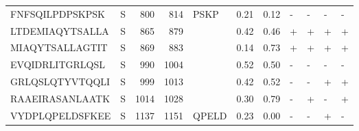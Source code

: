 \begin{tabular}{llrrlrrllll}
FNFSQILPDPSKPSK &       S &    800 &   814 &                PSKP &            0.21 &             0.12 &      - &       - &      - &       - \\
LTDEMIAQYTSALLA &       S &    865 &   879 &                     &            0.42 &             0.46 &      + &       + &      + &       + \\
MIAQYTSALLAGTIT &       S &    869 &   883 &                     &            0.14 &             0.73 &      + &       + &      + &       + \\
EVQIDRLITGRLQSL &       S &    990 &  1004 &                     &            0.52 &             0.50 &      - &       - &      - &       - \\
GRLQSLQTYVTQQLI &       S &    999 &  1013 &                     &            0.42 &             0.52 &      - &       - &      + &       + \\
RAAEIRASANLAATK &       S &   1014 &  1028 &                     &            0.30 &             0.79 &      - &       + &      - &       + \\
VYDPLQPELDSFKEE &       S &   1137 &  1151 &               QPELD &            0.23 &             0.00 &      - &       - &      + &       - \\
\bottomrule
\end{tabular}
